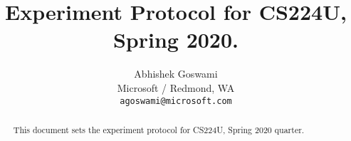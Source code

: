 \documentclass[11pt,a4paper]{article}
\title{Experiment Protocol for CS224U, Spring 2020.}
\author{Abhishek Goswami \\
  Microsoft / Redmond, WA \\
  \texttt{agoswami@microsoft.com}}
\date{}
\begin{document}
\maketitle

\begin{abstract}

This document sets the experiment protocol for CS224U, Spring 2020 quarter. 

\end{abstract}


%
%
%
%










\end{document}
